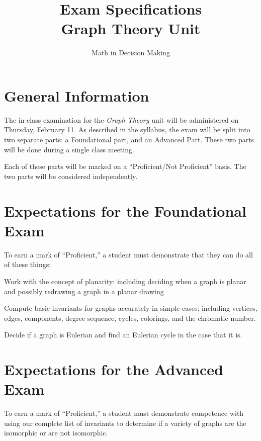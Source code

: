 \documentclass{article}
\begin{document}
\title{Exam Specifications\\ Graph Theory Unit}
\author{Math in Decision Making}

\maketitle

\section*{General Information}

The in-class examination for the \emph{Graph Theory} unit will be administered 
on Thursday, February 11. As described in the syllabus, the exam will be split into two separate parts: a Foundational
part, and an Advanced Part. These two parts will be done during a single class meeting.

Each of these parts will be marked on a ``Proficient/Not Proficient'' basis. The two parts will be considered 
independently.

\section*{Expectations for the Foundational Exam}

To earn a mark of  ``Proficient,'' a student must demonstrate that they can do all of these things:
\begin{compactitem}
\item Work with the concept of planarity: including deciding when a graph is planar and possibly redrawing a 
graph in a planar drawing
\item Compute basic invariants for graphs accurately in simple cases: including vertices, edges, components, degree 
sequence, cycles, colorings, and the chromatic number.
\item Decide if a graph is Eulerian and find an Eulerian cycle in the case that it is.
\end{compactitem}

\section*{Expectations for the Advanced Exam}

To earn a mark of ``Proficient,'' a student must demonstrate competence with using our complete list of invariants
to determine if a variety of graphs are the isomorphic or are not isomorphic.
\end{document}
